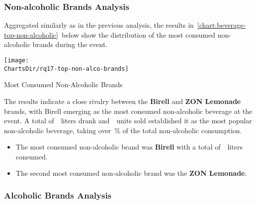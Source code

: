 \vspace*{\fill} %
\pagebreak[4]


\subsubsection{Non-alcoholic Brands Analysis}
\label{subsubsec:analysis-beverage-popular-non-alcoholic}


Aggregated similarly as in the previous analysis, the results in~\autoref{chart:beverage-top-non-alcoholic}~below show the distribution of the most consumed non-alcoholic brands during the event.

\begin{chart}[H]
	\centering
	\texttt{[image: \\ChartsDir/rq17-top-non-alco-brands]}
	\caption{ Most Consumed Non-Alcoholic Brands}
	\label{chart:beverage-top-non-alcoholic}
	\source
\end{chart}

The results indicate a close rivalry between the \textbf{Birell} and \textbf{ZON Lemonade} brands, with Birell emerging as the most consumed non-alcoholic beverage at the event.
A total of~~liters drank and~~units sold established it as the most popular non-alcoholic beverage, taking over~\% of the total non-alcoholic consumption.

\begin{keytakeaways}
	\begin{itemize}
		\item The most consumed non-alcoholic brand was \textbf{Birell} with a total of~~liters consumed.
		\item The second most consumed non-alcoholic brand was the \textbf{ZON Lemonade}.
	\end{itemize}
\end{keytakeaways}


\subsubsection{Alcoholic Brands Analysis}
\label{subsubsec:analysis-beverage-popular-alcoholic}

